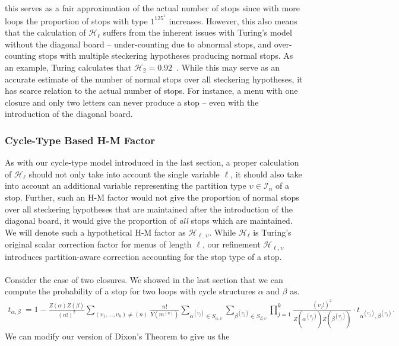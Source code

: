 this serves as a fair approximation of the actual number of stops
since with more loops the proportion of stops with type $1^125^1$
increases. However, this also means that the calculation of
$\mathcal{H}_\ell$ suffers from the inherent issues with Turing's model
without the diagonal board -- under-counting due to abnormal stops,
and over-counting stops with multiple steckering hypotheses producing
normal stops. As an example, Turing calculates that $\mathcal{H}_2 =
0.92$~\cite[p.~116]{Turing1940ProfBook}. While this may serve as an accurate estimate of the number of
normal stops over all steckering hypotheses, it has scarce relation
to the actual number of stops. For instance, a menu with one closure
and only two letters can never produce a stop -- even with the
introduction of the diagonal board.
\subsubsection{Cycle-Type Based H-M Factor}
As with our cycle-type model introduced in the last section, a proper
calculation of $\mathcal{H}_\ell$ should not only take into account the
single variable $\ell$, it should also take into account an additional
variable representing the partition type $\upsilon\in\mathcal{I}_n$ of a stop.
Further, such an H-M factor would not give the proportion of normal
stops over all steckering hypotheses that are maintained after the
introduction of the diagonal board, it would give the proportion of
\emph{all} stops which are maintained. We will denote such a
hypothetical H-M factor as $\mathcal{H}_{\ell,\upsilon}$. While
$\mathcal{H}_\ell$ is Turing's original scalar correction factor for
menus of length $\ell$, our refinement $\mathcal{H}_{\ell,\upsilon}$
introduces partition-aware correction accounting for the stop type of a stop.
\\\\Consider the case of two closures. We showed in the last section
that we can compute the probability of a stop for two loops with
cycle structures $\alpha$ and $\beta$ as.
\begin{align*}
  t_{\alpha, \beta}\ = 1 -
  \frac{Z(\alpha)Z(\beta)}{(n!)^2}\sum_{(\upsilon_1,\dots,\upsilon_k)\ne(n)}\frac{n!}{Y(m^{(\upsilon)})}\sum_{\alpha^{(\upsilon_j)}\in
  S_{\alpha,\upsilon}}\sum_{\beta^{(\upsilon_j)}\in
  S_{\beta,\upsilon}}\prod_{j=1}^k
  {\frac{(\upsilon_j!)^2}{Z(\alpha^{(\upsilon_j)})Z(\beta^{(\upsilon_j)})}}\cdot
  t_{\alpha^{(\upsilon_j)},\beta^{(\upsilon_j)}}.
\end{align*}
We can modify our version of Dixon's Theorem to give us the
